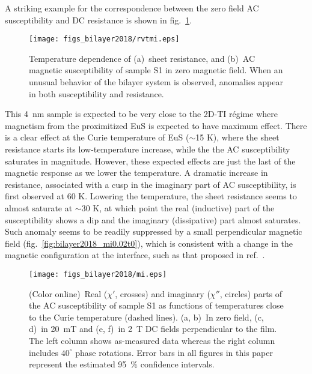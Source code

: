 A striking example for the correspondence between the zero field AC susceptibility and DC resistance is shown in fig.~\ref{fig:bilayer2018_mirvt}. %
 \begin{figure}[ht]%
	\centering%
    \subfloat{\label{fig:bilayer2018_s1rvt}}%
    \subfloat{\label{fig:bilayer2018_s1mi}}%
    \texttt{[image: figs\_bilayer2018/rvtmi.eps]}%
    \caption[Coincidental anomalies in the temperature dependence of resistance and of AC magnetic susceptibility of the (Bi$_{x}$Sb$_{1-x}$)$_2$Te$_3$--EuS bilayer sample S1]{\label{fig:bilayer2018_mirvt}Temperature dependence of (a)~sheet resistance, and (b)~AC magnetic susceptibility of sample S1 in zero magnetic field. When an unusual behavior of the bilayer system is observed, anomalies appear in both susceptibility and resistance.}%
\end{figure}%
This 4~nm sample is expected to be very close to the 2D-TI r\'egime where magnetism from the proximitized EuS is expected to have maximum effect. There is a clear effect at the Curie temperature of EuS ($\sim$15 K), where the sheet resistance starts its low-temperature increase, while the the AC susceptibility saturates in magnitude. However, these expected effects are just the last of the magnetic response as we lower the temperature. A dramatic increase in resistance, associated with a cusp in the imaginary part of AC susceptibility, is first observed at 60 K. Lowering the temperature, the sheet resistance seems to almost saturate at $\sim$30 K, at which point the real (inductive) part of the susceptibility shows a dip and the imaginary (dissipative) part almost saturates. Such anomaly seems to be readily suppressed by a small perpendicular magnetic field (fig.~\ref{fig:bilayer2018_mi0.02t0}), which is consistent with a change in the magnetic configuration at the interface, such as that proposed in ref.~\cite{Moodera2016}. %
\begin{figure}[ht]%
    \centering%
    \subfloat{\label{fig:bilayer2018_mi0t0}}%
    \subfloat{\label{fig:bilayer2018_mi0t40}}%
    \subfloat{\label{fig:bilayer2018_mi0.02t0}}%
    \subfloat{\label{fig:bilayer2018_mi0.02t40}}%
    \subfloat{\label{fig:bilayer2018_mi2t0}}%
    \subfloat{\label{fig:bilayer2018_mi2t40}}%
    \texttt{[image: figs\_bilayer2018/mi.eps]}%
    \caption[AC magnetic susceptibility of sample S1 in external DC fields.]{\label{fig:bilayer2018_mi}(Color online)~Real ($\chi'$, crosses) and imaginary ($\chi''$, circles) parts of the AC susceptibility of sample S1 as functions of temperatures close to the Curie temperature (dashed lines). (a, b)~In zero field, (c, d)~in 20~mT and (e, f)~in 2~T DC fields perpendicular to the film. The left column shows as-measured data whereas the right column includes $40^{\circ}$ phase rotations. Error bars in all figures in this paper represent the estimated 95~\protect\% confidence intervals.}%
\end{figure}%
